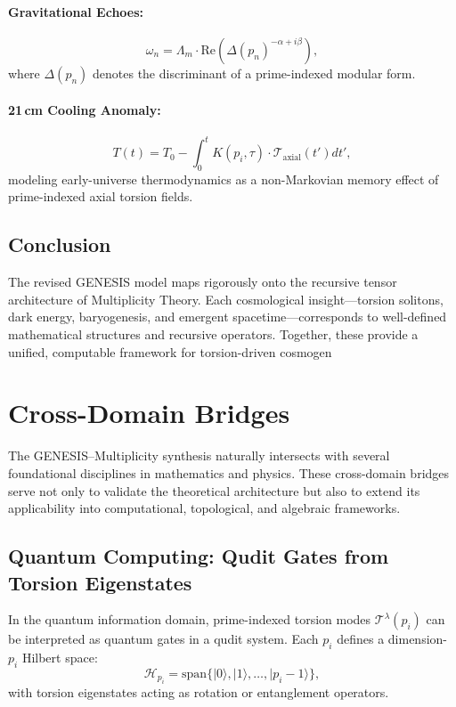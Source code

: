 \documentclass{article}
\theoremstyle{plain}
\begin{document}
\paragraph{Gravitational Echoes:}
\[
\omega_n = \Lambda_m \cdot \text{Re}\left(\Delta(p_n)^{-\alpha + i\beta}\right),
\]
where \( \Delta(p_n) \) denotes the discriminant of a prime-indexed modular form.

\paragraph{21\,cm Cooling Anomaly:}
\[
T(t) = T_0 - \int_0^t K(p_i, \tau) \cdot \mathcal{T}_{\text{axial}}(t') dt',
\]
modeling early-universe thermodynamics as a non-Markovian memory effect of prime-indexed axial torsion fields.

\subsection*{Conclusion}
The revised GENESIS model maps rigorously onto the recursive tensor architecture of Multiplicity Theory. Each cosmological insight—torsion solitons, dark energy, baryogenesis, and emergent spacetime—corresponds to well-defined mathematical structures and recursive operators. Together, these provide a unified, computable framework for torsion-driven cosmogen


\section{Cross-Domain Bridges}

The GENESIS–Multiplicity synthesis naturally intersects with several foundational disciplines in mathematics and physics. These cross-domain bridges serve not only to validate the theoretical architecture but also to extend its applicability into computational, topological, and algebraic frameworks.

\subsection{Quantum Computing: Qudit Gates from Torsion Eigenstates}

In the quantum information domain, prime-indexed torsion modes $\mathcal{T}^\lambda(p_i)$ can be interpreted as quantum gates in a qudit system. Each $p_i$ defines a dimension-$p_i$ Hilbert space:
\[
\mathcal{H}_{p_i} = \text{span}\{ |0\rangle, |1\rangle, \dots, |p_i - 1\rangle \},
\]
with torsion eigenstates acting as rotation or entanglement operators.
\end{document}
